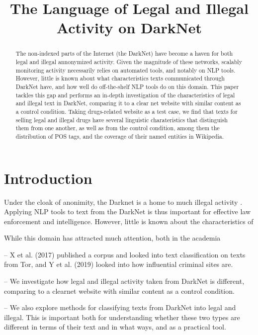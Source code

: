 \documentclass[11pt,a4paper]{article}
\title{The Language of Legal and Illegal Activity on DarkNet}
\date{}
\begin{document}
\maketitle

\begin{abstract}
  The non-indexed parts of the Internet (the DarkNet)
   have become a haven for both legal and illegal annonymized activity.
  Given the magnitude of these networks, scalably monitoring activity necessarily relies
    on automated tools, and notably on NLP tools.
  However, little is known about what characteristics texts communicated through DarkNet have, 
    and how well do off-the-shelf NLP tools do on this domain.
  This paper tackles this gap and performs an in-depth investigation of the characteristics
    of legal and illegal text in DarkNet, comparing it to a clear net website with similar
    content as a control condition.
  Taking drugs-related website as a test case, we find that texts for selling legal and illegal drugs
    have several linguistic charateristics that distinguish them from one another, as well as from 
    the control condition, among them the distribution of POS tags, and the coverage of their named entities in Wikipedia.
\end{abstract}



\section{Introduction}

  Under the cloak of anonimity, the Darknet is a home to much illegal activity \citep{moore2016cryptopolitik}. 
  Applying NLP tools to text from the DarkNet is thus important for effective law enforcement and intelligence.
  However, little is known about the characteristics of 

While this domain has attracted much attention, both in the academia

-- X et al. (2017) published a corpus and looked into text classification on texts from Tor, and Y et al. (2019) looked into how influential criminal sites are. 

-- We investigate how legal and illegal activity taken from DarkNet is different, comparing to a clearnet website with similar content as a control condition.

-- We also explore methods for classifying texts from DarkNet into legal and illegal. This is important both for understanding whether these two types are different in terms of
their text and in what ways, and as a practical tool.
\end{document}
